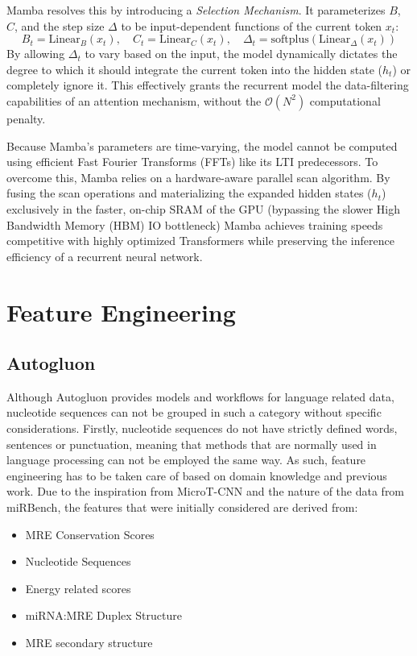 \documentclass[en,ack]{dimscthesis}
\begin{document}
Mamba resolves this by introducing a \textit{Selection Mechanism}. It parameterizes $B$, $C$, and the step size $\Delta$ to be input-dependent functions of the current token $x_t$:
\begin{equation}
	B_t = \text{Linear}_B(x_t), \quad C_t = \text{Linear}_C(x_t), \quad \Delta_t = \text{softplus}(\text{Linear}_\Delta(x_t))
\end{equation}
By allowing $\Delta_t$ to vary based on the input, the model dynamically dictates the degree to which it should integrate the current token into the hidden state ($h_t$) or completely ignore it. This effectively grants the recurrent model the data-filtering capabilities of an attention mechanism, without the $\mathcal{O}(N^2)$ computational penalty.

\par Because Mamba's parameters are time-varying, the model cannot be computed using efficient Fast Fourier Transforms (FFTs) like its LTI predecessors. To overcome this, Mamba relies on a hardware-aware parallel scan algorithm. By fusing the scan operations and materializing the expanded hidden states ($h_t$) exclusively in the faster, on-chip SRAM of the GPU (bypassing the slower High Bandwidth Memory (HBM) IO bottleneck) Mamba achieves training speeds competitive with highly optimized Transformers while preserving the inference efficiency of a recurrent neural network.

\section{Feature Engineering}
\subsection{Autogluon}
Although Autogluon provides models and workflows for language related data, nucleotide sequences can not be grouped in such a category without specific considerations. Firstly, nucleotide sequences do not have strictly defined words, sentences or punctuation, meaning that methods that are normally used in language processing can not be employed the same way. As such, feature engineering has to be taken care of based on domain knowledge and previous work. Due to the inspiration from MicroT-CNN and the nature of the data from miRBench, the features that were initially considered are derived from:
\newpage

\begin{itemize}
	\item MRE Conservation Scores
	\item Nucleotide Sequences
	\item Energy related scores
	\item miRNA:MRE Duplex Structure
	\item MRE secondary structure
\end{itemize}
\end{document}
